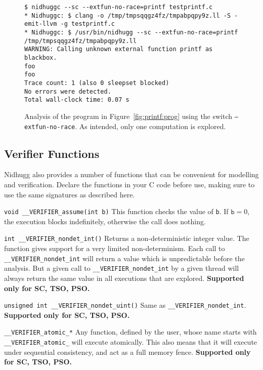 \documentclass[a4paper]{article}
\newcommand{\limitsupport}[1]{\textbf{Supported only for #1.}}
\begin{document}
\begin{figure}
  \scriptsize{
\begin{verbatim}
$ nidhuggc --sc --extfun-no-race=printf testprintf.c
* Nidhuggc: $ clang -o /tmp/tmpsqqgz4fz/tmpabpqpy9z.ll -S -emit-llvm -g testprintf.c
* Nidhuggc: $ /usr/bin/nidhugg --sc --extfun-no-race=printf /tmp/tmpsqqgz4fz/tmpabpqpy9z.ll
WARNING: Calling unknown external function printf as blackbox.
foo
foo
Trace count: 1 (also 0 sleepset blocked)
No errors were detected.
Total wall-clock time: 0.07 s
\end{verbatim}}
\caption{Analysis of the program in Figure~\ref{fig:printf:prog} using
  the switch \texttt{--extfun-no-race}. As intended, only one
  computation is explored.}\label{fig:printf:run:1}
\end{figure}


\subsection{Verifier Functions}

Nidhugg also provides a number of functions that can be convenient for
modelling and verification. Declare the functions in your C code
before use, making sure to use the same signatures as described here.

\begin{description}
\item{\texttt{void \_\_VERIFIER\_assume(int b)}}
%
  This function checks the value of \texttt{b}. If $\texttt{b} = 0$,
  the execution blocks indefinitely, otherwise the call does nothing.
\item{\texttt{int \_\_VERIFIER\_nondet\_int()}}
%
  Returns a non-deterministic integer value. The function gives
  support for a very limited non-determinism. Each call to
  \texttt{\_\_VERIFIER\_nondet\_int} will return a value which is
  unpredictable before the analysis. But a given call to
  \texttt{\_\_VERIFIER\_nondet\_int} by a given thread will always
  return the same value in all executions that are explored.
%
  \limitsupport{SC, TSO, PSO}
\item{\texttt{unsigned int \_\_VERIFIER\_nondet\_uint()}}
%
  Same as \texttt{\_\_VERIFIER\_nondet\_int}.
%
  \limitsupport{SC, TSO, PSO}
\item{\texttt{\_\_VERIFIER\_atomic\_*}}
%
  Any function, defined by the user, whose name starts with
  \texttt{\_\_VERIFIER\_atomic\_} will execute atomically. This also
  means that it will execute under sequential consistency, and act as
  a full memory fence.
%
  \limitsupport{SC, TSO, PSO}
\end{description}
\end{document}
